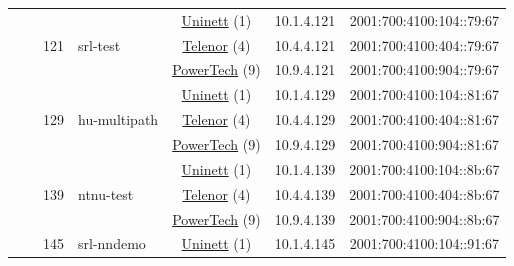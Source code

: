 \begin{small}
\begin{center}
\begin{longtable}{|c|c|c|c|c|c|c|c|}
  &  & \multirow{3}{*}{\tiny{121}} & \multicolumn{1}{|l|}{\multirow{3}{*}{\tiny{srl-test}}} & \multicolumn{2}{|c|}{\tiny{\href{https://www.uninett.no}{Uninett} (1)}} & \tiny{10.1.4.121} & \tiny{2001:700:4100:104::79:67} \\* \cline{5-5}\cline{6-6}\cline{7-7}\cline{8-8}
  &  &  &  & \multicolumn{2}{|c|}{\tiny{\href{https://www.telenor.no}{Telenor} (4)}} & \tiny{10.4.4.121} & \tiny{2001:700:4100:404::79:67} \\* \cline{5-5}\cline{6-6}\cline{7-7}\cline{8-8}
  &  &  &  & \multicolumn{2}{|c|}{\tiny{\href{http://www.powertech.no}{PowerTech} (9)}} & \tiny{10.9.4.121} & \tiny{2001:700:4100:904::79:67} \\* \cline{3-3}\cline{4-4}\cline{5-5}\cline{6-6}\cline{7-7}\cline{8-8}
  &  & \multirow{3}{*}{\tiny{129}} & \multicolumn{1}{|l|}{\multirow{3}{*}{\tiny{hu-multipath}}} & \multicolumn{2}{|c|}{\tiny{\href{https://www.uninett.no}{Uninett} (1)}} & \tiny{10.1.4.129} & \tiny{2001:700:4100:104::81:67} \\* \cline{5-5}\cline{6-6}\cline{7-7}\cline{8-8}
  &  &  &  & \multicolumn{2}{|c|}{\tiny{\href{https://www.telenor.no}{Telenor} (4)}} & \tiny{10.4.4.129} & \tiny{2001:700:4100:404::81:67} \\* \cline{5-5}\cline{6-6}\cline{7-7}\cline{8-8}
  &  &  &  & \multicolumn{2}{|c|}{\tiny{\href{http://www.powertech.no}{PowerTech} (9)}} & \tiny{10.9.4.129} & \tiny{2001:700:4100:904::81:67} \\* \cline{3-3}\cline{4-4}\cline{5-5}\cline{6-6}\cline{7-7}\cline{8-8}
  &  & \multirow{3}{*}{\tiny{139}} & \multicolumn{1}{|l|}{\multirow{3}{*}{\tiny{ntnu-test}}} & \multicolumn{2}{|c|}{\tiny{\href{https://www.uninett.no}{Uninett} (1)}} & \tiny{10.1.4.139} & \tiny{2001:700:4100:104::8b:67} \\* \cline{5-5}\cline{6-6}\cline{7-7}\cline{8-8}
  &  &  &  & \multicolumn{2}{|c|}{\tiny{\href{https://www.telenor.no}{Telenor} (4)}} & \tiny{10.4.4.139} & \tiny{2001:700:4100:404::8b:67} \\* \cline{5-5}\cline{6-6}\cline{7-7}\cline{8-8}
  &  &  &  & \multicolumn{2}{|c|}{\tiny{\href{http://www.powertech.no}{PowerTech} (9)}} & \tiny{10.9.4.139} & \tiny{2001:700:4100:904::8b:67} \\* \cline{3-3}\cline{4-4}\cline{5-5}\cline{6-6}\cline{7-7}\cline{8-8}
  &  & \multirow{3}{*}{\tiny{145}} & \multicolumn{1}{|l|}{\multirow{3}{*}{\tiny{srl-nndemo}}} & \multicolumn{2}{|c|}{\tiny{\href{https://www.uninett.no}{Uninett} (1)}} & \tiny{10.1.4.145} & \tiny{2001:700:4100:104::91:67} \\* \cline{5-5}\cline{6-6}\cline{7-7}\cline{8-8}

\end{longtable}
\end{center}
\end{small}
